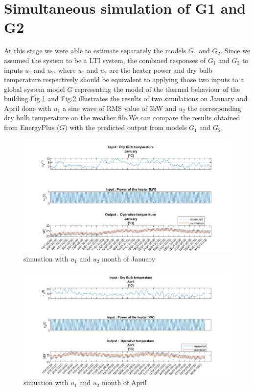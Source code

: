 \documentclass[a4paper,12pt]{report}
\numberwithin{equation}{section}
\begin{document}
\section{Simultaneous simulation  of G1 and G2}
At this stage we were able to estimate separately the models $G_{1}$ and $G_{2}$. Since we assumed the system to be a LTI system, the combined responses of $G_{1}$ and $G_{2}$ to inputs $u_{1}$ and $u_{2}$, where $u_{1}$ and $u_{2}$ are the heater power and dry bulb temperature respectively should be equivalent to applying those two inputs to a global system model $G$ representing the model of the thermal behaviour of the building.Fig.\ref{fig;heatDrycombJan} and 
Fig.\ref{fig;heatDrycombApr} illustrates the results of two simulations on January and April done with $u_{1}$ a sine wave of RMS value of 3kW and $u_{2}$ the corresponding dry bulb temperature on the weather file.We can compare the results obtained from EnergyPlus ($G$) with the predicted output from  models $G_{1}$ and $G_{2}$.

\begin{figure}[H]
    \includegraphics[width=.9\textwidth]{heatDrycombJan.png}
    \centering
    \caption{simuation with $u_{1}$ and $u_{2}$  month of January}
    \label{fig;heatDrycombJan}
\end{figure}
\begin{figure}[H]
    \includegraphics[width=.9\textwidth]{heatDrycombApr.png}
    \centering
    \caption{simuation with $u_{1}$ and $u_{2}$  month of April}
    \label{fig;heatDrycombApr}
\end{figure}
\end{document}
